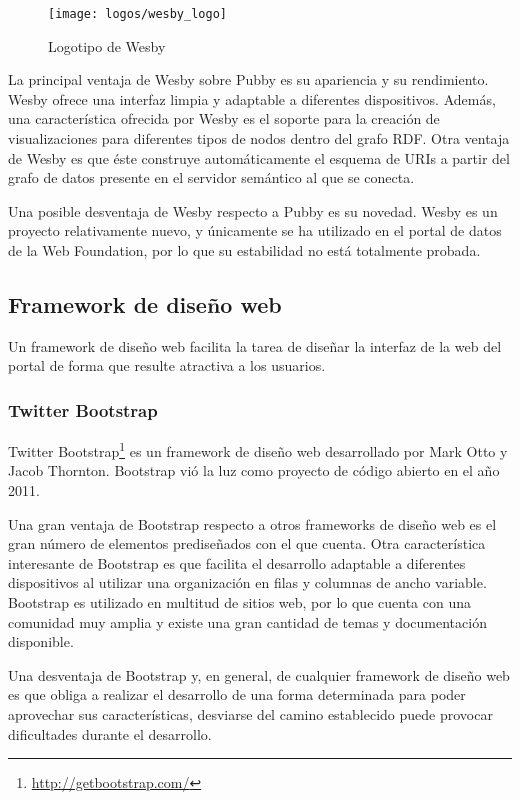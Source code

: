 \begin{figure}[h]
\centering
\texttt{[image: logos/wesby\_logo]}
\caption{Logotipo de Wesby}
\end{figure}

La principal ventaja de Wesby sobre Pubby es su apariencia y su rendimiento. Wesby ofrece una interfaz limpia y adaptable a diferentes dispositivos. Además, una característica ofrecida por Wesby es el soporte para la creación de visualizaciones para diferentes tipos de nodos dentro del grafo RDF. Otra ventaja de Wesby es que éste construye automáticamente el esquema de URIs a partir del grafo de datos presente en el servidor semántico al que se conecta.

Una posible desventaja de Wesby respecto a Pubby es su novedad. Wesby es un proyecto relativamente nuevo, y únicamente se ha utilizado en el portal de datos de la Web Foundation, por lo que su estabilidad no está totalmente probada.



\subsection{Framework de diseño web}
Un framework de diseño web facilita la tarea de diseñar la interfaz de la web del portal de forma que resulte atractiva a los usuarios.


\subsubsection{Twitter Bootstrap}
Twitter Bootstrap\footnote{\url{http://getbootstrap.com/}} es un framework de diseño web desarrollado por Mark Otto y Jacob Thornton.  Bootstrap vió la luz como proyecto de código abierto en el año 2011.

Una gran ventaja de Bootstrap respecto a otros frameworks de diseño web es el gran número de elementos prediseñados con el que cuenta. Otra característica interesante de Bootstrap es que facilita el desarrollo adaptable a diferentes dispositivos al utilizar una organización en filas y columnas de ancho variable.\\
Bootstrap es utilizado en multitud de sitios web, por lo que cuenta con una comunidad muy amplia y existe una gran cantidad de temas y documentación disponible.

Una desventaja de Bootstrap y, en general, de cualquier framework de diseño web es que obliga a realizar el desarrollo de una forma determinada para poder aprovechar sus características, desviarse del camino establecido puede provocar dificultades durante el desarrollo.


